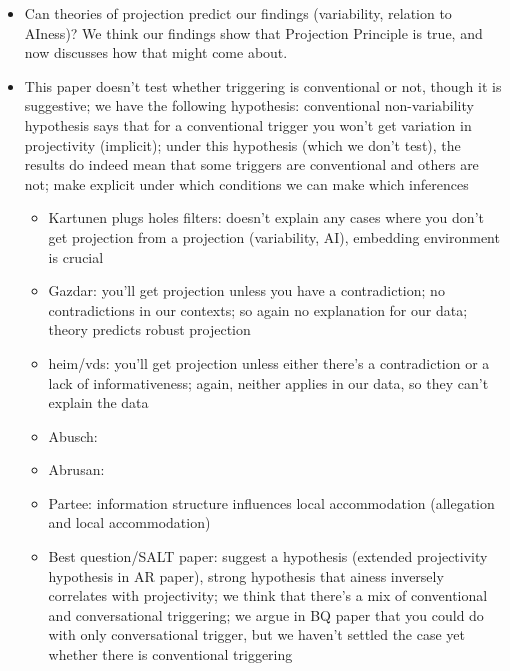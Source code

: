 \documentclass[11pt,fleqn]{article}
\newcommand{\6}{\mbox{$[\hspace*{-.6mm}[$}}
\newcommand{\9}{\mbox{$]\hspace*{-.6mm}]$}}
\begin{document}
\begin{itemize}

\item Can theories of projection predict our findings (variability, relation to AIness)? We think our findings show that Projection Principle is true, and now discusses how that might come about.

\item This paper doesn't test whether triggering is conventional or not, though it is suggestive; we have the following hypothesis: conventional non-variability hypothesis says that for a conventional trigger you won't get variation in projectivity (implicit); under this hypothesis (which we don't test), the results do indeed mean that some triggers are conventional and others are not; make explicit under which conditions we can make which inferences

\begin{itemize}

\item Kartunen plugs holes filters: doesn't explain any cases where you don't get projection from a projection (variability, AI), embedding environment is crucial

\item Gazdar: you'll get projection unless you have a contradiction; no contradictions in our contexts; so again no explanation for our data; theory predicts robust projection

\item heim/vds: you'll get projection unless either there's a contradiction or a lack of informativeness; again, neither applies in our data, so they can't explain the data

\item Abusch:

\item Abrusan: 

\item Partee: information structure influences local accommodation (allegation and local accommodation)

\item Best question/SALT paper: suggest a hypothesis (extended projectivity hypothesis in AR paper), strong hypothesis that ainess inversely correlates with projectivity; we think that there's a mix of conventional and conversational triggering; we argue in BQ paper that you could do with only conversational trigger, but we haven't settled the case yet whether there is conventional triggering


\end{itemize}
\end{itemize}
\end{document}
